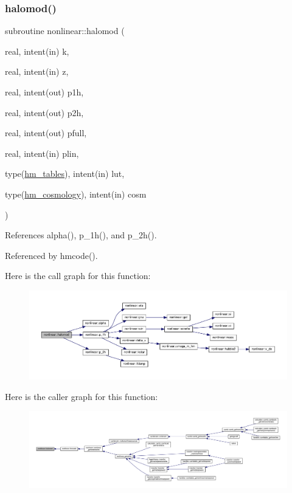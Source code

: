 \subsubsection{\texorpdfstring{halomod()}{halomod()}}
{\footnotesize\ttfamily subroutine nonlinear\+::halomod (\begin{DoxyParamCaption}\item[{real, intent(in)}]{k,  }\item[{real, intent(in)}]{z,  }\item[{real, intent(out)}]{p1h,  }\item[{real, intent(out)}]{p2h,  }\item[{real, intent(out)}]{pfull,  }\item[{real, intent(in)}]{plin,  }\item[{type(\mbox{\hyperlink{structnonlinear_1_1hm__tables}{hm\+\_\+tables}}), intent(in)}]{lut,  }\item[{type(\mbox{\hyperlink{structnonlinear_1_1hm__cosmology}{hm\+\_\+cosmology}}), intent(in)}]{cosm }\end{DoxyParamCaption})\hspace{0.3cm}{\ttfamily [private]}}



References alpha(), p\+\_\+1h(), and p\+\_\+2h().



Referenced by hmcode().

Here is the call graph for this function\+:
\nopagebreak
\begin{figure}[H]
\begin{center}
\leavevmode
\includegraphics[width=350pt]{namespacenonlinear_a8b11cb79c822afc15ee5506a6b79e786_cgraph}
\end{center}
\end{figure}
Here is the caller graph for this function\+:
\nopagebreak
\begin{figure}[H]
\begin{center}
\leavevmode
\includegraphics[width=350pt]{namespacenonlinear_a8b11cb79c822afc15ee5506a6b79e786_icgraph}
\end{center}
\end{figure}
\mbox{\label{namespacenonlinear_af025b4b6e2a711cea66352e50ea6de97}} 
